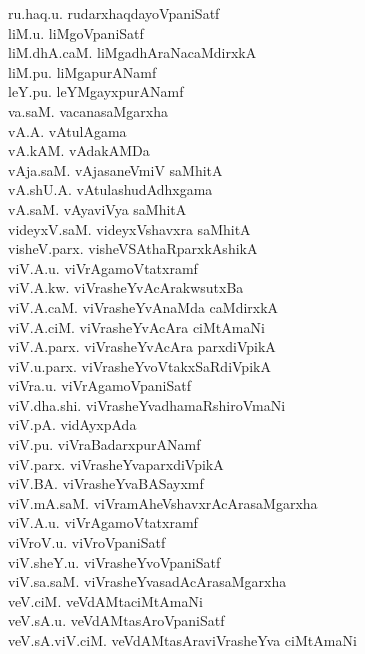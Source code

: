 {\begin{multicols}{2}
\begin{tabbing}
ru.haq.u. \> rudarxhaqdayoVpaniSatf\\[2pt]
liM.u. \> liMgoVpaniSatf\\[2pt]
liM.dhA.caM. \> liMgadhAraNacaMdirxkA\\[2pt]
liM.pu. \> liMgapurANamf\\[2pt]
leY.pu. \> leYMgayxpurANamf\\[2pt]
va.saM. \> vacanasaMgarxha\\[2pt]
vA.A. \> vAtulAgama\\[2pt]
vA.kAM. \> vAdakAMDa\\[2pt]
vAja.saM. \> vAjasaneVmiV saMhitA\\[2pt]
vA.shU.A. \> vAtulashudAdhxgama\\[2pt]
vA.saM. \> vAyaviVya saMhitA\\[2pt]
videyxV.saM. \> videyxVshavxra saMhitA\\[2pt]
visheV.parx. \> visheVSAthaRparxkAshikA\\[2pt]
viV.A.u. \> viVrAgamoVtatxramf\\[2pt]
viV.A.kw. \> viVrasheYvAcArakwsutxBa\\[2pt]
viV.A.caM. \> viVrasheYvAnaMda caMdirxkA\\[2pt]
viV.A.ciM. \> viVrasheYvAcAra ciMtAmaNi\\[2pt]
viV.A.parx. \> viVrasheYvAcAra parxdiVpikA\\[2pt]
viV.u.parx. \> viVrasheYvoVtakxSaRdiVpikA\\[2pt]
viVra.u. \> viVrAgamoVpaniSatf\\[2pt]
viV.dha.shi. \> viVrasheYvadhamaRshiroVmaNi\\[2pt]
viV.pA. \> vidAyxpAda\\[2pt]
viV.pu. \> viVraBadarxpurANamf\\[2pt]
viV.parx. \> viVrasheYvaparxdiVpikA\\[2pt]
viV.BA. \> viVrasheYvaBASayxmf\\[2pt]
viV.mA.saM. \> viVramAheVshavxrAcArasaMgarxha\\[2pt]
viV.A.u. \> viVrAgamoVtatxramf\\[2pt]
viVroV.u. \> viVroVpaniSatf\\[2pt]
viV.sheY.u. \> viVrasheYvoVpaniSatf\\[2pt]
viV.sa.saM. \> viVrasheYvasadAcArasaMgarxha\\[2pt]
veV.ciM. \> veVdAMtaciMtAmaNi\\[2pt]
veV.sA.u. \> veVdAMtasAroVpaniSatf\\[2pt]
veV.sA.viV.ciM. \> veVdAMtasAraviVrasheYva ciMtAmaNi\\[2pt]

\end{tabbing}
\end{multicols}}
